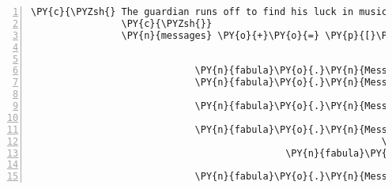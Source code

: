 \begin{Verbatim}[commandchars=\\\{\},numbers=left,firstnumber=1,stepnumber=1]
                \PY{c}{\PYZsh{} The guardian runs off to find his luck in music making}
                \PY{c}{\PYZsh{}}
                \PY{n}{messages} \PY{o}{+}\PY{o}{=} \PY{p}{[}\PY{n}{fabula}\PY{o}{.}\PY{n}{Message}\PY{p}{(}\PY{p}{[}\PY{n}{fabula}\PY{o}{.}\PY{n}{DropsEvent}\PY{p}{(}\PY{n}{ID\PYZus{}CASSANDRA}\PY{p}{,}
                                                               \PY{n+nb+bp}{self}\PY{o}{.}\PY{n}{host}\PY{o}{.}\PY{n}{rack}\PY{o}{.}\PY{n}{entity\PYZus{}dict}\PY{p}{[}\PY{l+s}{\PYZsq{}}\PY{l+s}{lute}\PY{l+s}{\PYZsq{}}\PY{p}{]}\PY{p}{,}
                                                               \PY{n}{room}\PY{o}{.}\PY{n}{entity\PYZus{}locations}\PY{p}{[}\PY{l+s}{\PYZsq{}}\PY{l+s}{guardian}\PY{l+s}{\PYZsq{}}\PY{p}{]}\PY{p}{)}\PY{p}{]}\PY{p}{)}\PY{p}{,}
                             \PY{n}{fabula}\PY{o}{.}\PY{n}{Message}\PY{p}{(}\PY{p}{[}\PY{n}{fabula}\PY{o}{.}\PY{n}{DeleteEvent}\PY{p}{(}\PY{l+s}{\PYZsq{}}\PY{l+s}{lute}\PY{l+s}{\PYZsq{}}\PY{p}{)}\PY{p}{]}\PY{p}{)}\PY{p}{,}
                             \PY{n}{fabula}\PY{o}{.}\PY{n}{Message}\PY{p}{(}\PY{p}{[}\PY{n}{fabula}\PY{o}{.}\PY{n}{MovesToEvent}\PY{p}{(}\PY{n}{identifier}\PY{o}{=}\PY{l+s}{\PYZsq{}}\PY{l+s}{guardian}\PY{l+s}{\PYZsq{}}\PY{p}{,}
                                                                 \PY{n}{location}\PY{o}{=}\PY{p}{(}\PY{l+m+mi}{2}\PY{p}{,} \PY{l+m+mi}{2}\PY{p}{)}\PY{p}{)}\PY{p}{]}\PY{p}{)}\PY{p}{,}
                             \PY{n}{fabula}\PY{o}{.}\PY{n}{Message}\PY{p}{(}\PY{p}{[}\PY{n}{fabula}\PY{o}{.}\PY{n}{MovesToEvent}\PY{p}{(}\PY{n}{identifier}\PY{o}{=}\PY{l+s}{\PYZsq{}}\PY{l+s}{guardian}\PY{l+s}{\PYZsq{}}\PY{p}{,}
                                                                 \PY{n}{location}\PY{o}{=}\PY{p}{(}\PY{l+m+mi}{1}\PY{p}{,} \PY{l+m+mi}{2}\PY{p}{)}\PY{p}{)}\PY{p}{]}\PY{p}{)}\PY{p}{,}
                             \PY{n}{fabula}\PY{o}{.}\PY{n}{Message}\PY{p}{(}\PY{p}{[}\PY{n}{fabula}\PY{o}{.}\PY{n}{SaysEvent}\PY{p}{(}\PY{n}{identifier}\PY{o}{=}\PY{n}{ID\PYZus{}KUNI}\PY{p}{,}
                                                              \PY{n}{text}\PY{o}{=}\PY{l+s}{\PYZsq{}}\PY{l+s}{Juhu der Weg ist frei!}\PY{l+s}{\PYZsq{}}\PY{p}{)}\PY{p}{,}
                                             \PY{n}{fabula}\PY{o}{.}\PY{n}{MovesToEvent}\PY{p}{(}\PY{n}{identifier}\PY{o}{=}\PY{l+s}{\PYZsq{}}\PY{l+s}{guardian}\PY{l+s}{\PYZsq{}}\PY{p}{,}
                                                                 \PY{n}{location}\PY{o}{=}\PY{p}{(}\PY{l+m+mi}{0}\PY{p}{,} \PY{l+m+mi}{2}\PY{p}{)}\PY{p}{)}\PY{p}{]}\PY{p}{)}\PY{p}{,}
                             \PY{n}{fabula}\PY{o}{.}\PY{n}{Message}\PY{p}{(}\PY{p}{[}\PY{n}{fabula}\PY{o}{.}\PY{n}{DeleteEvent}\PY{p}{(}\PY{l+s}{\PYZsq{}}\PY{l+s}{guardian}\PY{l+s}{\PYZsq{}}\PY{p}{)}\PY{p}{]}\PY{p}{)}\PY{p}{,}

\end{Verbatim}
